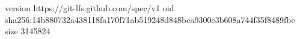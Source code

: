 version https://git-lfs.github.com/spec/v1
oid sha256:14b880732a438118fa170f71ab519248d848bca9300e3b608a744f35f8489fbe
size 3145824

